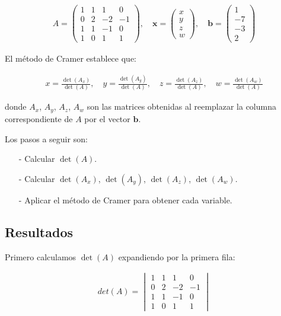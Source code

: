 \documentclass{article}
\begin{document}
\begin{align*}
    A = \begin{pmatrix}
    1 & 1 & 1 & 0 \\
    0 & 2 & -2 & -1 \\
    1 & 1 & -1 & 0 \\
    1 & 0 & 1 & 1
    \end{pmatrix}, \quad \mathbf{x} = \begin{pmatrix} x \\ y \\ z \\ w \end{pmatrix}, \quad \mathbf{b} = \begin{pmatrix} 1 \\ -7 \\ -3 \\ 2 \end{pmatrix}
\end{align*}

El método de Cramer establece que:

\begin{align*}
    x = \frac{\det(A_x)}{\det(A)}, \quad y = \frac{\det(A_y)}{\det(A)}, \quad z = \frac{\det(A_z)}{\det(A)}, \quad w = \frac{\det(A_w)}{\det(A)}    
\end{align*}

donde $A_x$, $A_y$, $A_z$, $A_w$ son las matrices obtenidas al reemplazar la columna correspondiente de $A$ por el vector $\mathbf{b}$.

Los pasos a seguir son:
\begin{enumerate}
    \item[-] Calcular $\det(A)$.
    \item[-] Calcular $\det(A_x)$, $\det(A_y)$, $\det(A_z)$, $\det(A_w)$.
    \item[-] Aplicar el método de Cramer para obtener cada variable.
\end{enumerate}

\subsection{Resultados}
\setcounter{equation}{0}

Primero calculamos $\det(A)$ expandiendo por la primera fila:

\begin{align}
    det(A) = \begin{vmatrix}
    1 & 1 & 1 & 0 \\
    0 & 2 & -2 & -1 \\
    1 & 1 & -1 & 0 \\
    1 & 0 & 1 & 1
    \end{vmatrix}
\end{align}
\end{document}
